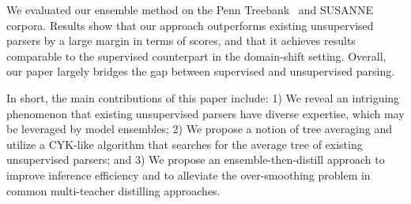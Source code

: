 \documentclass{article}
\begin{document}
We evaluated our ensemble method on the Penn Treebank~\citep[PTB;][]{marcus-etal-1993-building} and SUSANNE~\citep{SusanneCorpus} corpora. Results show that our approach outperforms existing unsupervised parsers by a large margin in terms of  scores, and that it achieves results comparable to the supervised counterpart in the domain-shift setting. Overall, our paper largely bridges the gap between supervised and unsupervised parsing.

In short, the main contributions of this paper include: 1) We reveal an intriguing phenomenon that existing unsupervised parsers have diverse expertise, which may be leveraged by model ensembles; 2) We propose a notion of tree averaging and utilize a CYK-like algorithm that searches for the average tree of existing unsupervised parsers; and 3) We propose an ensemble-then-distill approach to improve inference efficiency and to alleviate the over-smoothing problem in common multi-teacher distilling approaches.
\end{document}
